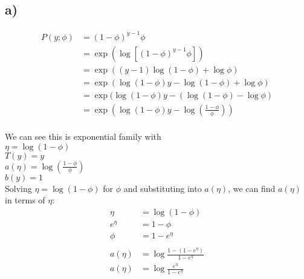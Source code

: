 \documentclass[11pt]{article}
\begin{document}
\subsection*{a)}

\begin{align*}
    P(y;\phi) &= (1-\phi)^{y-1} \phi \\
              &= \exp(\log[(1-\phi)^{y-1} \phi]) \\
              &= \exp ( (y-1) \log(1-\phi) + \log\phi ) \\
              &= \exp ( \log(1-\phi) y - \log(1-\phi) + \log \phi ) \\
              &= \exp ( \log(1-\phi) y - (\log(1-\phi) - \log \phi ) \\
              &= \exp ( \log(1-\phi) y - \log(\frac{1-\phi}{\phi}) ) \\
\end{align*}

We can see this is exponential family with \\
$\eta = \log(1-\phi)$ \\
$T(y) = y$ \\
$a(\eta) = \log(\frac{1-\phi}{\phi})$ \\
$b(y) = 1$ \\

Solving $\eta = \log(1-\phi)$ for $\phi$ and substituting into $a(\eta)$, we can find $a(\eta)$ in terms of $\eta$:
\begin{align*}
    \eta       &= \log(1-\phi) \\
    e^{\eta}   &= 1-\phi \\
    \phi       &= 1 - e^{\eta} \\
    \\
    a(\eta) &= \log \frac{1-(1-e^\eta)}{1-e^\eta} \\
    a(\eta) &= \log \frac{e^\eta}{1-e^\eta} \\
\end{align*}
\end{document}
